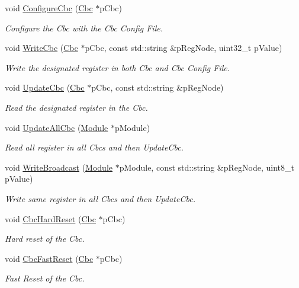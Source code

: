 \begin{DoxyCompactItemize}
void \hyperlink{class_ph2___hw_interface_1_1_cbc_interface_a0567c7a31f70f446202e60d037c869ea}{Configure\-Cbc} (\hyperlink{class_ph2___hw_description_1_1_cbc}{Cbc} $\ast$p\-Cbc)
\begin{DoxyCompactList}\small\item\em Configure the Cbc with the Cbc Config File. \end{DoxyCompactList}\item 
void \hyperlink{class_ph2___hw_interface_1_1_cbc_interface_afcde3c318e031defea6f28660cfcba9f}{Write\-Cbc} (\hyperlink{class_ph2___hw_description_1_1_cbc}{Cbc} $\ast$p\-Cbc, const std\-::string \&p\-Reg\-Node, uint32\-\_\-t p\-Value)
\begin{DoxyCompactList}\small\item\em Write the designated register in both Cbc and Cbc Config File. \end{DoxyCompactList}\item 
void \hyperlink{class_ph2___hw_interface_1_1_cbc_interface_ac2c24e9993f4c2d6b59748fabfb439e5}{Update\-Cbc} (\hyperlink{class_ph2___hw_description_1_1_cbc}{Cbc} $\ast$p\-Cbc, const std\-::string \&p\-Reg\-Node)
\begin{DoxyCompactList}\small\item\em Read the designated register in the Cbc. \end{DoxyCompactList}\item 
void \hyperlink{class_ph2___hw_interface_1_1_cbc_interface_a2c9f30c3546a3337db1fc5e7fd5cb90c}{Update\-All\-Cbc} (\hyperlink{class_ph2___hw_description_1_1_module}{Module} $\ast$p\-Module)
\begin{DoxyCompactList}\small\item\em Read all register in all Cbcs and then Update\-Cbc. \end{DoxyCompactList}\item 
void \hyperlink{class_ph2___hw_interface_1_1_cbc_interface_af4a7fb33df95b0052bf5046910676aec}{Write\-Broadcast} (\hyperlink{class_ph2___hw_description_1_1_module}{Module} $\ast$p\-Module, const std\-::string \&p\-Reg\-Node, uint8\-\_\-t p\-Value)
\begin{DoxyCompactList}\small\item\em Write same register in all Cbcs and then Update\-Cbc. \end{DoxyCompactList}\item 
void \hyperlink{class_ph2___hw_interface_1_1_cbc_interface_a0e9a7f5c0a444cb8ca14f3a90cd9e759}{Cbc\-Hard\-Reset} (\hyperlink{class_ph2___hw_description_1_1_cbc}{Cbc} $\ast$p\-Cbc)
\begin{DoxyCompactList}\small\item\em Hard reset of the Cbc. \end{DoxyCompactList}\item 
void \hyperlink{class_ph2___hw_interface_1_1_cbc_interface_ae2166f5bd24481d88bdd015d1db08051}{Cbc\-Fast\-Reset} (\hyperlink{class_ph2___hw_description_1_1_cbc}{Cbc} $\ast$p\-Cbc)
\begin{DoxyCompactList}\small\item\em Fast Reset of the Cbc. \end{DoxyCompactList}\end{DoxyCompactItemize}
